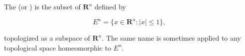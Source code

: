 The  (or ) is the subset of $\mathbf{R}^n$ defined by

$$E^n = \{x \in \mathbf{R}^n : |x| \leq 1\},$$

topologized as a subspace of $\mathbf{R}^n$. The same name is sometimes applied to any topological space homeomorphic to $E^n$.

